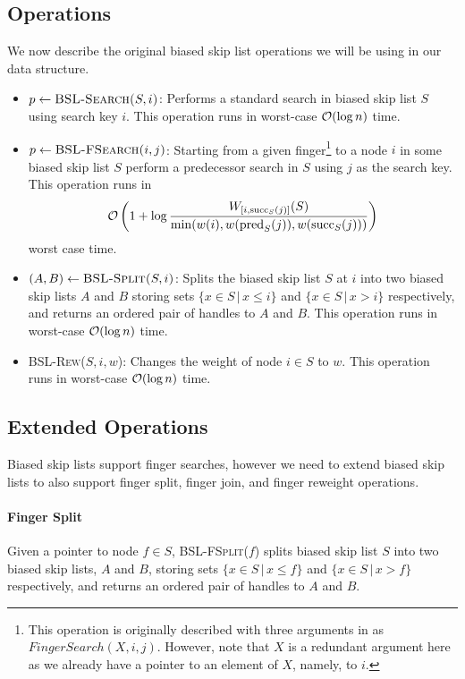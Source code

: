 \documentclass[11pt]{article}
\newcommand{\Bslfsrcx}[2]{\mbox{\textsc{BSL-FSearch(\ensuremath{#1,#2})}}}
\newcommand{\Bslfsplx}[1]{\mbox{\textsc{BSL-FSplit(\ensuremath{#1})}}}
\newcommand{\Bslsrcx}[2]{\mbox{\textsc{BSL-Search(\ensuremath{#1,#2})}}}
\newcommand{\Bslsplx}[2]{\mbox{\textsc{BSL-Split(\ensuremath{#1,#2})}}}
\newcommand{\Bslrewx}[3]{\mbox{\textsc{BSL-Rew(\ensuremath{#1,#2,#3})}}}
\newcommand{\interweight}[3]{{\ensuremath{W_{[#2,#3]}(#1)}}}
\newcommand{\nodeweight}[1]{{\ensuremath{w(\node #1)}}}
\newcommand{\node}[1]{\ensuremath{#1}}
\newcommand{\bsl}[1]{\ensuremath{#1}}
\newcommand{\pre}[2]{\text{pred}\ensuremath{_{#1}(#2)}}
\newcommand{\suc}[2]{\text{succ}\ensuremath{_{#1}(#2)}}
\begin{document}
\subsection{Operations} 
\label{subsec:BSLOps} 

We now describe the original biased skip list operations we will be using in our data structure. 

\begin{itemize} 

 \item $p \leftarrow \Bslsrcx{S}{i}$: Performs a standard search in biased skip list $\bsl S$ using search key $i$. This operation runs in worst-case ${\cal O}(\log n)$ time. 
 \item $p\leftarrow \Bslfsrcx{i}{j}$: Starting from a given finger\footnote{This operation is originally described with three arguments in \cite{journals/algorithmica/BagchiBG05} as $FingerSearch(X,i,j)$. However, note that $X$ is a redundant argument here as we already have a pointer to an element of $X$, namely, to $i$.} to a node $\node i$ in some biased skip list $\bsl S$ perform a predecessor search in  $\bsl S$ using $j$ as the search key. This operation runs in 
\[ 
{\cal O}\left(1 + \log\frac{\interweight{S}{i}{\suc{S}{j}}}{\min(\nodeweight{i},\nodeweight{\pre{S}{j}}, \nodeweight{\suc{S}{j}})}\right) 
\] worst case time. 
 \item $(A,\bsl B)\leftarrow \Bslsplx{S}{i}$: Splits the biased skip list $\bsl S$ at $i$ into two biased skip lists \bsl A and \bsl B storing sets $\{x\in S\,|\, x\leq i\}$ and $\{x\in S\,|\,x> i\}$ respectively, and returns an ordered pair of handles to $\bsl A$ and $\bsl B$. This operation runs in worst-case ${\cal O}(\log n)$ time. 

\item \Bslrewx{S}{i}{w}: Changes the weight of node $\node i\in \bsl S$ to $w$. This operation runs in worst-case ${\cal O}(\log n)$ time. 


\end{itemize} 

\subsection{Extended Operations} 
\label{subsec:BSLExtOps} 
Biased skip lists support finger searches, however we need to extend biased skip lists to also support finger split, finger join, and finger reweight operations. 


\paragraph{Finger Split} Given a pointer to node $\node f\in\bsl S$, \Bslfsplx{f} splits biased skip list $\bsl S$ into two biased skip lists, \bsl A and \bsl B, storing sets $\{\node x\in \bsl S\,|\, \node x\leq \node f\}$ and $\{\node x\in \bsl S\,|\, \node x> \node f\}$ respectively, and returns an ordered pair of handles to $\bsl A$ and $\bsl B$. 
\end{document}
